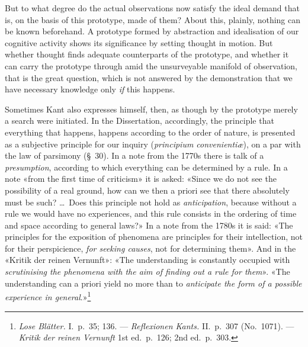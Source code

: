 \documentclass[12pt,a4paper]{article}
\begin{document}
But to what degree do the actual observations now satisfy the ideal demand
that is, on the basis of this prototype, made of them? About this, plainly,
nothing can be known beforehand. A prototype formed by abstraction and
idealisation of our cognitive activity shows its significance by setting
thought in motion. But whether thought finds adequate counterparts of the
prototype, and whether it can carry the prototype through amid the
unsurveyable manifold of observation, that is the great question, which is
not answered by the demonstration that we have necessary knowledge only \emph{if}
this happens.

Sometimes Kant also expresses himself, then, as though by the prototype
merely a search were initiated. In the Dissertation, accordingly, the
principle that everything that happens, happens according to the order of
nature, is presented as a subjective principle for our inquiry
(\textit{principium convenientiæ}), on a par with the law of parsimony (§\
30). In a note from the 1770s there is talk of a \emph{presumption}, according to
which everything can be determined by a rule. In a note «from the first
time of criticism» it is asked: «Since we do not see the possibility of a
real ground, how can we then a priori see that there absolutely must be
such? \ldots\ Does this principle not hold as \emph{anticipation}, because without
a rule we would have no experiences, and this rule consists in the ordering
of time and space according to general laws?» In a note from the 1780s it
is said: «The principles for the exposition of phenomena are principles for
their intellection, not for their perspicience, \emph{for seeking causes}, not for
determining them». And in the «Kritik der reinen Vernunft»: «The
understanding is constantly occupied with \emph{scrutinising the phenomena with
the aim of finding out a rule for them}». «The understanding can a priori
yield no more than to \emph{anticipate the form of a possible experience in
general}.»\footnote{\textit{Lose Blätter.} I.\ p.\ 35; 136. ---
\textit{Reflexionen Kants.} II.\ p.\ 307 (No.\ 1071). --- \textit{Kritik
der reinen Vernunft} 1st ed.\ p.\ 126; 2nd ed.\ p.\ 303.}
\end{document}
